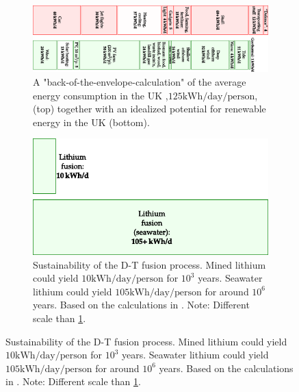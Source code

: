 \begin{figure}[htbp]
    \centering
    \begin{subfigure}[h]{1.00\textwidth}
        \centering
        \includegraphics[width=1.0\textwidth]{fig/intro/energyConsumption}
        \caption{A "back-of-the-envelope-calculation" of the average energy consumption in the UK ,$125 \text{kWh/day/person}$, (top) together with an idealized potential for renewable energy in the UK (bottom).}
    \label{fig:energyConsumption}
    \end{subfigure}%
    \vfill
    \begin{subfigure}[h]{1.00\textwidth}
        \centering
        \includegraphics{fig/intro/lithium}
        \caption{
        Sustainability of the D-T fusion process.
        Mined lithium could yield $10 \text{kWh/day/person}$ for $10^{3}$ years.
        Seawater lithium could yield $105 \text{kWh/day/person}$ for around $10^{6}$ years.
        Based on the calculations in \cite{ongena2012,Eckhartt1995}.
        Note: Different scale than \cref{fig:energyConsumption}.
        }


\end{subfigure}
\end{figure}
